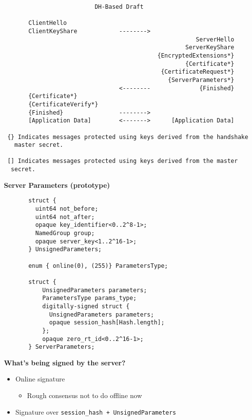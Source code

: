 \documentclass[helvetica]{seminar}
\newcommand{\heading}[1]{%
  \begin{center} 
    \large\bf 
    #1 
  \end{center} 
  \vspace{.4 in}}
\begin{document}
\begin{slide}
\begin{footnotesize}
\begin{verbatim}
                          DH-Based Draft

       ClientHello
       ClientKeyShare            -------->
                                                       ServerHello
                                                    ServerKeyShare
                                            {EncryptedExtensions*}
                                                    {Certificate*}
                                             {CertificateRequest*}
                                               {ServerParameters*}
                                 <--------              {Finished}
       {Certificate*}
       {CertificateVerify*}
       {Finished}                -------->
       [Application Data]        <------->      [Application Data]

 {} Indicates messages protected using keys derived from the handshake
   master secret.

 [] Indicates messages protected using keys derived from the master
  secret.
\end{verbatim}
\end{footnotesize}
\end{slide}



\begin{slide}
\heading{Server Parameters (prototype)}
\vspace{-.25in}
{\scriptsize
\begin{verbatim}
       struct {
         uint64 not_before;
         uint64 not_after;
         opaque key_identifier<0..2^8-1>;
         NamedGroup group;
         opaque server_key<1..2^16-1>;
       } UnsignedParameters;

       enum { online(0), (255)} ParametersType;
       
       struct {
           UnsignedParameters parameters;
           ParametersType params_type;
           digitally-signed struct {
             UnsignedParameters parameters;
             opaque session_hash[Hash.length];
           };
           opaque zero_rt_id<0..2^16-1>;
       } ServerParameters;

\end{verbatim}
}
\end{slide}

\begin{slide}
\heading{What's being signed by the server?}

\begin{itemize}
\item Online signature
  \begin{itemize}
  \item Rough consensus not to do offline now
  \end{itemize}
  
\item Signature over \verb^session_hash + UnsignedParameters^
\end{itemize}
\end{slide}
\end{document}
